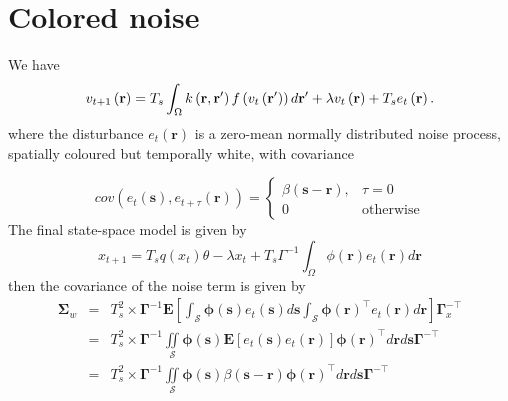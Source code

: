 \documentclass[onecolumn,draftcls]{IEEEtran}
\begin{document}
\section{Colored noise}
We have
\begin{equation}
v_{t + 1}\left( \mathbf{r} \right)  = T_s\int_\Omega  {k\left( {{\bf{r}} , {\bf{r'}}} \right)f\left( {{v_t}\left( \bf{r'} \right)} \right)d{\bf{r'}}} + \lambda v_t\left( {\bf{r}} \right) + T_se_t\left( {\mathbf{r}} \right).
\end{equation}
where the disturbance $e_t(\mathbf r)$ is a zero-mean normally distributed noise process, spatially coloured but temporally white, with covariance 

\begin{equation}
cov(e_t(\mathbf{s}),e_{t+\tau}(\mathbf{r}))=
\begin{cases}
\beta\left(\mathbf{s}-\mathbf{r}\right), & \tau=0 \\
0 & \mathrm{otherwise}
\end{cases}
\label{eq:FieldCovariance}
\end{equation}
The final state-space model is given by
\begin{equation}
x_{t + 1} = T_sq(x_t)\theta -\lambda x_t + T_s\Gamma^{-1}\int_\Omega  {\phi ( \mathbf{r} )e_t( \mathbf{r} )d\mathbf{r}}
\end{equation}
then the covariance of the noise term is given by
\begin{eqnarray}
\mathbf \Sigma_w&{}={}&T_s^2 \times \mathbf{\Gamma}^{-1}\mathbf E[\int_{\mathcal{S}}\boldsymbol\phi\left(\mathbf s\right)e_t\left(\mathbf s\right)d\mathbf s\int_{\mathcal{S}}\boldsymbol\phi\left(\mathbf r\right)^{\top}e_t\left(\mathbf r\right)d\mathbf r]\mathbf{\Gamma}_{x}^{- \top} \nonumber \\
&=&T_s^2 \times\mathbf{\Gamma}^{-1}\iint\limits_{\mathcal{S}}\boldsymbol\phi\left(\mathbf s\right) \mathbf E[e_t\left(\mathbf s\right)e_t\left(\mathbf r\right)]\boldsymbol\phi\left(\mathbf r\right)^{\top}d\mathbf r d\mathbf s\mathbf{\Gamma}^{- \top} \nonumber\\
&=&{}T_s^2 \times\mathbf{\Gamma}^{-1}\iint\limits_{\mathcal{S}}\boldsymbol\phi\left(\mathbf s\right) \beta\left(\mathbf s- \mathbf r \right)\boldsymbol\phi\left(\mathbf r\right)^{\top}d\mathbf r d\mathbf s\mathbf{\Gamma}^{- \top} 
\end{eqnarray}
\end{document}
